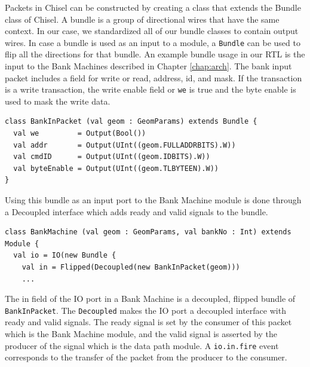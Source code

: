 Packets in Chisel can be constructed by creating a class that extends the Bundle class of Chisel. A bundle is a group of directional wires that have the same context. In our case, we standardized all of our bundle classes to contain output wires. In case a bundle is used as an input to a module, a \verb|Bundle| can be used to flip all the directions for that bundle. An example bundle usage in our RTL is the input to the Bank Machines described in Chapter \ref{chap:arch}. The bank input packet includes a field for write or read, address, id, and mask. If the transaction is a write transaction, the write enable field or \verb|we| is true and the byte enable is used to mask the write data. 
\begin{verbatim}
class BankInPacket (val geom : GeomParams) extends Bundle {
  val we         = Output(Bool())
  val addr       = Output(UInt((geom.FULLADDRBITS).W))
  val cmdID      = Output(UInt((geom.IDBITS).W))
  val byteEnable = Output(UInt((geom.TLBYTEEN).W))
}
\end{verbatim}
Using this bundle as an input port to the Bank Machine module is done through a Decoupled interface which adds ready and valid signals to the bundle. 
\begin{verbatim}
class BankMachine (val geom : GeomParams, val bankNo : Int) extends Module {
  val io = IO(new Bundle {
    val in = Flipped(Decoupled(new BankInPacket(geom)))
    ...
\end{verbatim}
The in field of the IO port in a Bank Machine is a decoupled, flipped bundle of \verb|BankInPacket|. The \verb|Decoupled| makes the IO port a decoupled interface with ready and valid signals. The ready signal is set by the consumer of this packet which is the Bank Machine module, and the valid signal is asserted by the producer of the signal which is the data path module. A \verb|io.in.fire| event corresponds to the transfer of the packet from the producer to the consumer. 
